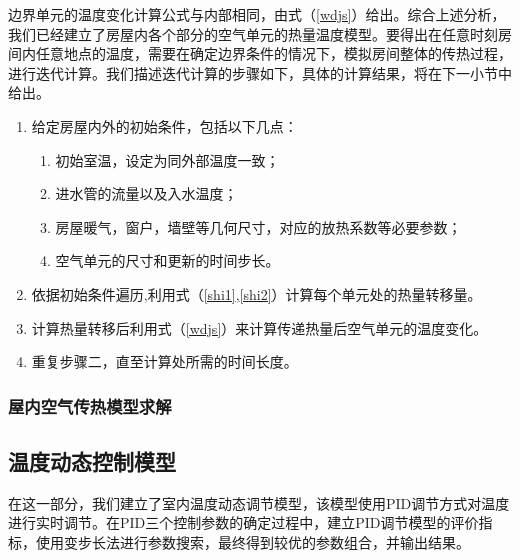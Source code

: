 \documentclass{my_paper}
\renewenvironment{framed}[1][\hsize]
  {\MakeFramed{\hsize#1\advance\hsize-\width \FrameRestore}}%
  {\endMakeFramed}
\begin{document}
边界单元的温度变化计算公式与内部相同，由式（\ref{wdjs}）给出。综合上述分析，我们已经建立了房屋内各个部分的空气单元的热量温度模型。要得出在任意时刻房间内任意地点的温度，需要在确定边界条件的情况下，模拟房间整体的传热过程，进行迭代计算。我们描述迭代计算的步骤如下，具体的计算结果，将在下一小节中给出。
{
    \renewcommand\theenumi{\chinese{enumi}}
    \renewcommand\labelenumi{\textbf{步骤\theenumi：}}
    \begin{framed}[0.7\textwidth]
        \centering
        \begin{minipage}[h][0.9\textwidth][c]{24em}
            \begin{enumerate}
                \item 给定房屋内外的初始条件，包括以下几点：
                \begin{enumerate}
                    \item 初始室温，设定为同外部温度一致；
                    \item 进水管的流量以及入水温度；
                    \item 房屋暖气，窗户，墙壁等几何尺寸，对应的放热系数等必要参数；
                    \item 空气单元的尺寸和更新的时间步长。
                \end{enumerate}
                \item 依据初始条件遍历,利用式（\ref{shi1},\ref{shi2}）计算每个单元处的热量转移量。
                \item 计算热量转移后利用式（\ref{wdjs}）来计算传递热量后空气单元的温度变化。
                \item 重复步骤二，直至计算处所需的时间长度。
            \end{enumerate}
        \end{minipage}
\end{framed}
}

\subsubsection{屋内空气传热模型求解}

\subsection{温度动态控制模型}
在这一部分，我们建立了室内温度动态调节模型，该模型使用PID调节方式对温度进行实时调节。在PID三个控制参数的确定过程中，建立PID调节模型的评价指标，使用变步长法进行参数搜索，最终得到较优的参数组合，并输出结果。
\end{document}
